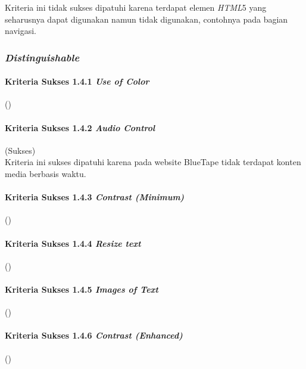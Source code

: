 Kriteria ini tidak sukses dipatuhi karena terdapat elemen \textit{HTML}5 yang seharusnya dapat digunakan namun tidak digunakan, contohnya pada bagian navigasi.

\subsubsection{\textit{Distinguishable}}
\label{subsubsec:kepatuhan_bluetape_distinguishable}

\paragraph{Kriteria Sukses 1.4.1 \textit{Use of Color}}
\label{par:kepatuhan_bluetape_kriteria_sukses_1.4.1}
()\\

\paragraph{Kriteria Sukses 1.4.2 \textit{Audio Control}}
\label{par:kepatuhan_bluetape_kriteria_sukses_1.4.2}
(Sukses)\\

Kriteria ini sukses dipatuhi karena pada website BlueTape tidak terdapat konten media berbasis waktu.

\paragraph{Kriteria Sukses 1.4.3 \textit{Contrast (Minimum)}}
\label{par:kepatuhan_bluetape_kriteria_sukses_1.4.3}
()\\

\paragraph{Kriteria Sukses 1.4.4 \textit{Resize text}}
\label{par:kepatuhan_bluetape_kriteria_sukses_1.4.4}
()\\

\paragraph{Kriteria Sukses 1.4.5 \textit{Images of Text}}
\label{par:kepatuhan_bluetape_kriteria_sukses_1.4.5}
()\\

\paragraph{Kriteria Sukses 1.4.6 \textit{Contrast (Enhanced)}}
\label{par:kepatuhan_bluetape_kriteria_sukses_1.4.2}
()\\

